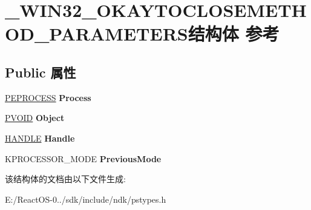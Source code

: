 \hypertarget{struct___w_i_n32___o_k_a_y_t_o_c_l_o_s_e_m_e_t_h_o_d___p_a_r_a_m_e_t_e_r_s}{}\section{\+\_\+\+W\+I\+N32\+\_\+\+O\+K\+A\+Y\+T\+O\+C\+L\+O\+S\+E\+M\+E\+T\+H\+O\+D\+\_\+\+P\+A\+R\+A\+M\+E\+T\+E\+R\+S结构体 参考}
\label{struct___w_i_n32___o_k_a_y_t_o_c_l_o_s_e_m_e_t_h_o_d___p_a_r_a_m_e_t_e_r_s}
\subsection*{Public 属性}
\begin{DoxyCompactItemize}
\item 
\mbox{\label{struct___w_i_n32___o_k_a_y_t_o_c_l_o_s_e_m_e_t_h_o_d___p_a_r_a_m_e_t_e_r_s_a98b37f831ab016317585f2360887f380}} 
\hyperlink{struct___e_p_r_o_c_e_s_s}{P\+E\+P\+R\+O\+C\+E\+SS} {\bfseries Process}
\item 
\mbox{\label{struct___w_i_n32___o_k_a_y_t_o_c_l_o_s_e_m_e_t_h_o_d___p_a_r_a_m_e_t_e_r_s_a0e133f40b45739b9c121a1e19db2df18}} 
\hyperlink{interfacevoid}{P\+V\+O\+ID} {\bfseries Object}
\item 
\mbox{\label{struct___w_i_n32___o_k_a_y_t_o_c_l_o_s_e_m_e_t_h_o_d___p_a_r_a_m_e_t_e_r_s_ae9f9e8a39ecc498a2d3cf06cf2b52d2a}} 
\hyperlink{interfacevoid}{H\+A\+N\+D\+LE} {\bfseries Handle}
\item 
\mbox{\label{struct___w_i_n32___o_k_a_y_t_o_c_l_o_s_e_m_e_t_h_o_d___p_a_r_a_m_e_t_e_r_s_ab22e97da53fd5c7ef59f18001e842d71}} 
K\+P\+R\+O\+C\+E\+S\+S\+O\+R\+\_\+\+M\+O\+DE {\bfseries Previous\+Mode}
\end{DoxyCompactItemize}


该结构体的文档由以下文件生成\+:\begin{DoxyCompactItemize}
\item 
E\+:/\+React\+O\+S-\/0../sdk/include/ndk/pstypes.\+h\end{DoxyCompactItemize}

